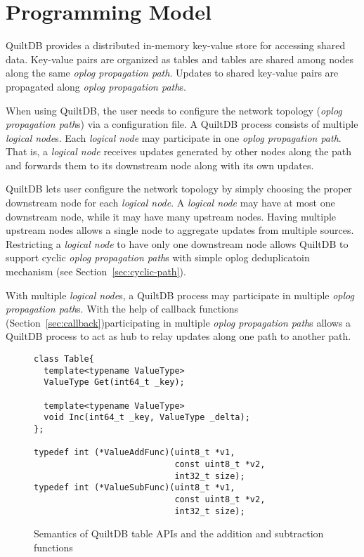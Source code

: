 \documentclass{acm_proc_article-sp}
\begin{document}
\section{Programming Model}

QuiltDB provides a distributed in-memory key-value store for accessing shared 
data. Key-value pairs are organized as tables and tables are shared among 
nodes along the same \emph{oplog propagation path}. Updates to shared key-value 
pairs are propagated along \emph{oplog propagation path}s.

When using QuiltDB, the user needs to configure the network topology 
(\emph{oplog propagation path}s) via a configuration file. 
A QuiltDB process consists of multiple \emph{logical node}s.
Each \emph{logical node} may participate in one \emph{oplog propagation path}. 
That is, a \emph{logical node} receives updates generated by other nodes along 
the path and forwards them to its downstream node along with its own updates. 

QuiltDB lets user configure the network topology by simply choosing the proper
downstream node for each \emph{logical node}. A \emph{logical node} may have at 
most one downstream node, while it may have many upstream nodes. Having multiple
 upstream nodes allows a single node to aggregate updates from multiple sources.
 Restricting a \emph{logical node} to have only one downstream node allows 
QuiltDB to support cyclic \emph{oplog propagation path}s with simple oplog 
deduplicatoin mechanism (see Section~\ref{sec:cyclic-path}).

With multiple \emph{logical node}s, a QuiltDB process may participate in 
multiple \emph{oplog propagation path}s. With the help of callback functions 
(Section~\ref{sec:callback})participating in multiple \emph{oplog propagation path}s
allows a QuiltDB process to act as hub to relay updates along one path to 
another path.

\begin{figure}[th!]
\begin{verbatim}
class Table{
  template<typename ValueType>
  ValueType Get(int64_t _key);
  
  template<typename ValueType>
  void Inc(int64_t _key, ValueType _delta);
};

typedef int (*ValueAddFunc)(uint8_t *v1, 
                            const uint8_t *v2,
                            int32_t size);
typedef int (*ValueSubFunc)(uint8_t *v1, 
                            const uint8_t *v2,
                            int32_t size);

\end{verbatim}
\caption{Semantics of QuiltDB table APIs and the addition and subtraction 
  functions}
\label{fig:table-api}
\end{figure}
\end{document}
